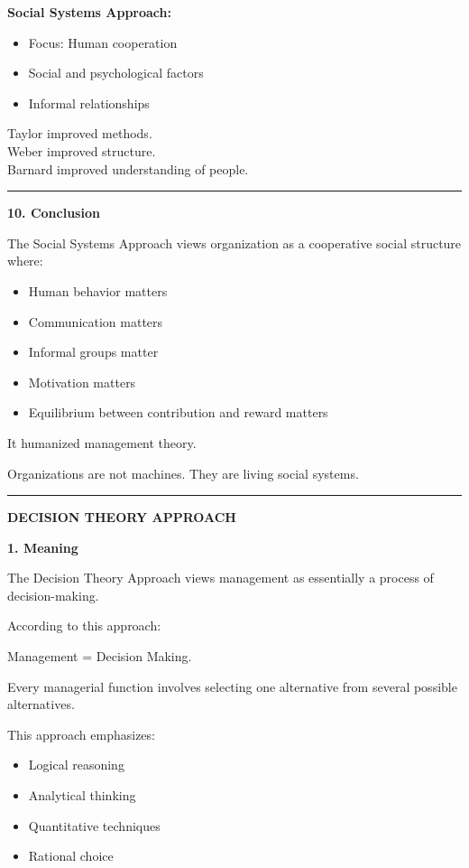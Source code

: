 \documentclass[10pt,a4paper]{article}
\newcommand{\separator}{\vspace{0.4em}\noindent\rule{\linewidth}{0.6pt}\vspace{0.4em}}
\begin{document}
\textbf{Social Systems Approach:}
\begin{itemize}
  \item Focus: Human cooperation
  \item Social and psychological factors
  \item Informal relationships
\end{itemize}

Taylor improved methods.\\
Weber improved structure.\\
Barnard improved understanding of people.

\separator

\textbf{10. Conclusion}

The Social Systems Approach views organization as a cooperative social structure where:

\begin{itemize}
  \item Human behavior matters
  \item Communication matters
  \item Informal groups matter
  \item Motivation matters
  \item Equilibrium between contribution and reward matters
\end{itemize}

It humanized management theory.

Organizations are not machines.
They are living social systems.

\separator

\begin{center}
  \large\textbf{DECISION THEORY APPROACH}
\end{center}

\textbf{1. Meaning}

The Decision Theory Approach views management as essentially a process of decision-making.

According to this approach:

\begin{center}
Management = Decision Making.
\end{center}

Every managerial function involves selecting one alternative from several possible
alternatives.

This approach emphasizes:
\begin{itemize}
  \item Logical reasoning
  \item Analytical thinking
  \item Quantitative techniques
  \item Rational choice
\end{itemize}
\end{document}
